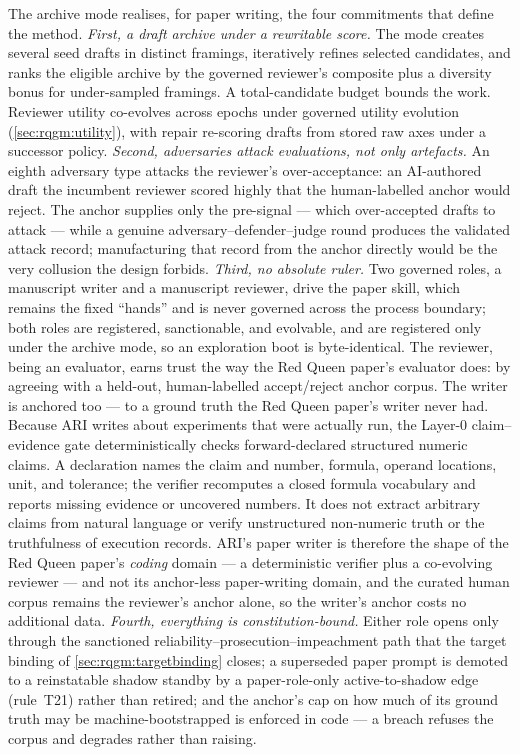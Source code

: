 The archive mode realises, for paper writing, the four commitments that
define the method. \emph{First, a draft archive under a rewritable score.}
The mode creates several seed drafts in distinct framings, iteratively
refines selected candidates, and ranks the eligible archive by the
governed reviewer's composite plus a diversity bonus for under-sampled
framings. A total-candidate budget bounds the work. Reviewer utility
co-evolves across epochs under governed utility evolution
(\cref{sec:rqgm:utility}), with repair re-scoring drafts from stored raw
axes under a successor policy.
\emph{Second,
adversaries attack evaluations, not only artefacts.} An eighth adversary
type attacks the reviewer's over-acceptance: an AI-authored draft the
incumbent reviewer scored highly that the human-labelled anchor would
reject. The anchor supplies only the pre-signal --- which over-accepted
drafts to attack --- while a genuine adversary--defender--judge round
produces the validated attack record; manufacturing that record from the
anchor directly would be the very collusion the design forbids.
\emph{Third, no absolute ruler.} Two governed roles, a manuscript writer
and a manuscript reviewer, drive the paper skill, which remains the
fixed ``hands'' and is never governed across the process boundary;
both roles are registered, sanctionable, and evolvable, and are
registered only under the archive mode, so an exploration boot is
byte-identical. The reviewer, being an evaluator, earns trust the way the
Red Queen paper's evaluator does: by agreeing with a held-out,
human-labelled accept/reject anchor corpus. The writer is anchored too ---
to a ground truth the Red Queen paper's writer never had. Because ARI
writes about experiments that were actually run, the Layer-0
claim--evidence gate deterministically checks forward-declared structured
numeric claims. A declaration names the claim and number, formula,
operand locations, unit, and tolerance; the verifier recomputes a closed
formula vocabulary and reports missing evidence or uncovered numbers. It
does not extract arbitrary claims from natural language or verify
unstructured non-numeric truth or the truthfulness of execution records.
ARI's paper
writer is therefore the shape of the Red Queen paper's \emph{coding}
domain --- a deterministic verifier plus a co-evolving reviewer --- and
not its anchor-less paper-writing domain, and the curated human corpus
remains the reviewer's anchor alone, so the writer's anchor costs no
additional data. \emph{Fourth, everything is constitution-bound.} Either
role opens only through the sanctioned
reliability--prosecution--impeachment path that the target binding of
\cref{sec:rqgm:targetbinding} closes; a superseded paper prompt is
demoted to a reinstatable shadow standby by a paper-role-only
active-to-shadow edge (rule~T21) rather than retired; and the anchor's cap
on how much of its ground truth may be machine-bootstrapped is enforced
in code --- a breach refuses the corpus and degrades rather than raising.

